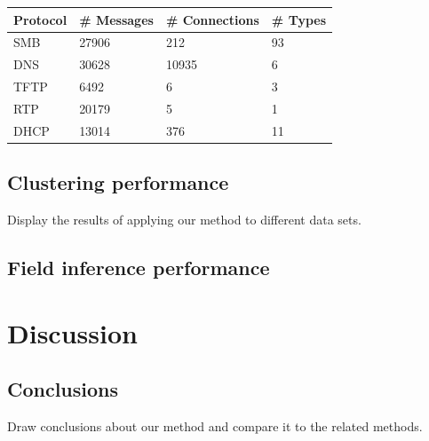 \documentclass[a4paper]{report}
\begin{document}





\begin{center}
    \begin{tabular}{ | l | l | l | l |}
        \hline
        \textbf{Protocol}&\textbf{\# Messages}&\textbf{\# Connections}&\textbf{\# Types}\\ \hline
        SMB         & 27906         & 212           & 93        \\ \hline
        DNS         & 30628         & 10935         & 6         \\ \hline
        TFTP        & 6492          & 6             & 3         \\ \hline
        RTP         & 20179         & 5             & 1         \\ \hline
        DHCP        & 13014         & 376           & 11        \\ \hline
    \end{tabular}
\end{center}

\section{Clustering performance}
Display the results of applying our method to different data sets.

\section{Field inference performance}
%

\chapter{Discussion}

\section{Conclusions}
Draw conclusions about our method and compare it to the related methods.
\end{document}
